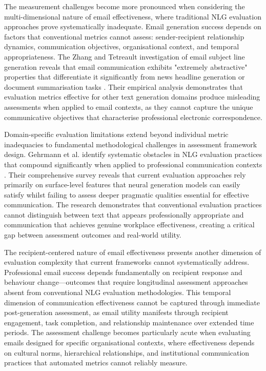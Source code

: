 The measurement challenges become more pronounced when considering the multi-dimensional nature of email effectiveness, where traditional NLG evaluation approaches prove systematically inadequate. Email generation success depends on factors that conventional metrics cannot assess: sender-recipient relationship dynamics, communication objectives, organisational context, and temporal appropriateness. The Zhang and Tetreault investigation of email subject line generation reveals that email communication exhibits "extremely abstractive" properties that differentiate it significantly from news headline generation or document summarisation tasks \cite{zhang2019email_subject}. Their empirical analysis demonstrates that evaluation metrics effective for other text generation domains produce misleading assessments when applied to email contexts, as they cannot capture the unique communicative objectives that characterise professional electronic correspondence.

Domain-specific evaluation limitations extend beyond individual metric inadequacies to fundamental methodological challenges in assessment framework design. Gehrmann et al. identify systematic obstacles in NLG evaluation practices that compound significantly when applied to professional communication contexts \cite{gehrmann2022nlg_evaluation_obstacles}. Their comprehensive survey reveals that current evaluation approaches rely primarily on surface-level features that neural generation models can easily satisfy whilst failing to assess deeper pragmatic qualities essential for effective communication. The research demonstrates that conventional evaluation practices cannot distinguish between text that appears professionally appropriate and communication that achieves genuine workplace effectiveness, creating a critical gap between assessment outcomes and real-world utility.

The recipient-centered nature of email effectiveness presents another dimension of evaluation complexity that current frameworks cannot systematically address. Professional email success depends fundamentally on recipient response and behaviour change—outcomes that require longitudinal assessment approaches absent from conventional NLG evaluation methodologies. This temporal dimension of communication effectiveness cannot be captured through immediate post-generation assessment, as email utility manifests through recipient engagement, task completion, and relationship maintenance over extended time periods. The assessment challenge becomes particularly acute when evaluating emails designed for specific organisational contexts, where effectiveness depends on cultural norms, hierarchical relationships, and institutional communication practices that automated metrics cannot reliably measure.

